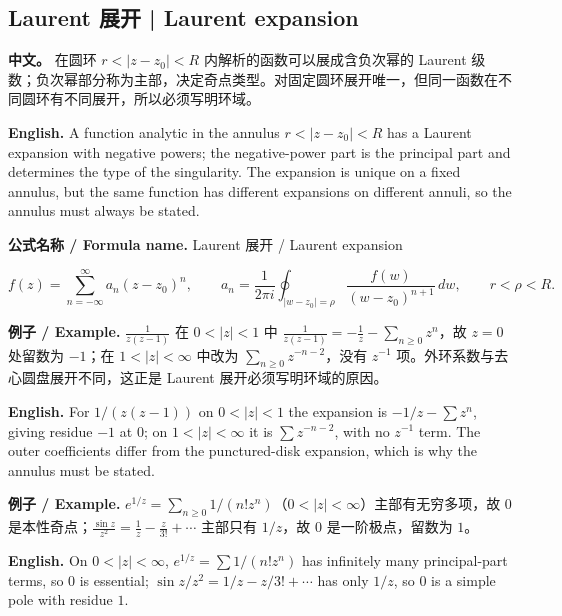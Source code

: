 \documentclass[UTF8,11pt,a4paper]{ctexart}
\newcommand{\EN}[1]{\par\noindent \textbf{English.} #1\par}
\newcommand{\FORMULA}[2]{\par\noindent\textbf{公式名称 / Formula name.} #1 / #2\par}
\newcommand{\EX}[2]{\par\noindent \textbf{例子 / Example.} #1\par\EN{#2}}
\newcommand{\APS}[2]{\par\noindent\textbf{中文。} #1\par\noindent\textbf{English.} #2\par\smallskip}
\begin{document}
\subsection{Laurent 展开 | Laurent expansion}
\APS{在圆环 $r<|z-z_0|<R$ 内解析的函数可以展成含负次幂的 Laurent 级数；负次幂部分称为主部，决定奇点类型。对固定圆环展开唯一，但同一函数在不同圆环有不同展开，所以必须写明环域。}{A function analytic in the annulus $r<|z-z_0|<R$ has a Laurent expansion with negative powers; the negative-power part is the principal part and determines the type of the singularity. The expansion is unique on a fixed annulus, but the same function has different expansions on different annuli, so the annulus must always be stated.}
\FORMULA{Laurent 展开}{Laurent expansion}
\[
f(z)=\sum_{n=-\infty}^{\infty}a_n(z-z_0)^n,\qquad
a_n=\frac1{2\pi i}\oint_{|w-z_0|=\rho}\frac{f(w)}{(w-z_0)^{n+1}}\,dw,\qquad r<\rho<R.
\]
\EX{$\frac1{z(z-1)}$ 在 $0<|z|<1$ 中 $\frac1{z(z-1)}=-\frac1z-\sum_{n\ge0}z^n$，故 $z=0$ 处留数为 $-1$；在 $1<|z|<\infty$ 中改为 $\sum_{n\ge0}z^{-n-2}$，没有 $z^{-1}$ 项。外环系数与去心圆盘展开不同，这正是 Laurent 展开必须写明环域的原因。}{For $1/(z(z-1))$ on $0<|z|<1$ the expansion is $-1/z-\sum z^n$, giving residue $-1$ at $0$; on $1<|z|<\infty$ it is $\sum z^{-n-2}$, with no $z^{-1}$ term. The outer coefficients differ from the punctured-disk expansion, which is why the annulus must be stated.}
\EX{$e^{1/z}=\sum_{n\ge0}1/(n!z^n)$（$0<|z|<\infty$）主部有无穷多项，故 $0$ 是本性奇点；$\frac{\sin z}{z^2}=\frac1z-\frac z{3!}+\cdots$ 主部只有 $1/z$，故 $0$ 是一阶极点，留数为 $1$。}{On $0<|z|<\infty$, $e^{1/z}=\sum 1/(n!z^n)$ has infinitely many principal-part terms, so $0$ is essential; $\sin z/z^2=1/z-z/3!+\cdots$ has only $1/z$, so $0$ is a simple pole with residue $1$.}
\end{document}
